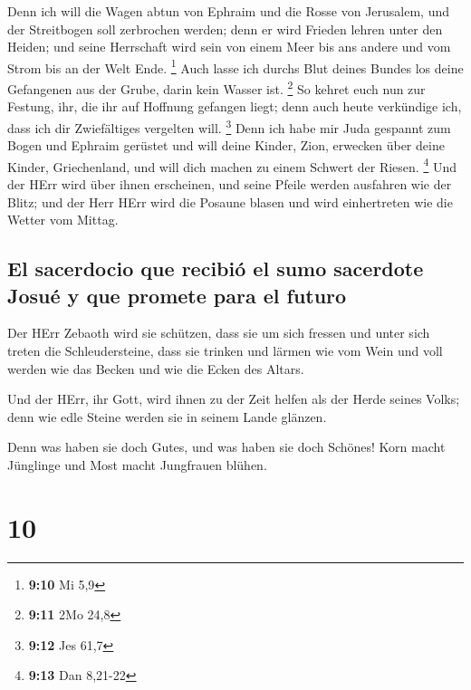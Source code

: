  Denn ich will die Wagen abtun von Ephraim und die Rosse
von Jerusalem, und der Streitbogen soll zerbrochen werden; denn er wird
Frieden lehren unter den Heiden; und seine Herrschaft wird sein von
einem Meer bis ans andere und vom Strom bis an der Welt Ende.
\footnote{\textbf{9:10} Mi 5,9}  Auch lasse ich durchs
Blut deines Bundes los deine Gefangenen aus der Grube, darin kein Wasser
ist. \footnote{\textbf{9:11} 2Mo 24,8}  So kehret euch
nun zur Festung, ihr, die ihr auf Hoffnung gefangen liegt; denn auch
heute verkündige ich, dass ich dir Zwiefältiges vergelten will.
\footnote{\textbf{9:12} Jes 61,7}  Denn ich habe mir Juda
gespannt zum Bogen und Ephraim gerüstet und will deine Kinder, Zion,
erwecken über deine Kinder, Griechenland, und will dich machen zu einem
Schwert der Riesen. \footnote{\textbf{9:13} Dan 8,21-22} 
Und der HErr wird über ihnen erscheinen, und seine Pfeile werden
ausfahren wie der Blitz; und der Herr HErr wird die Posaune blasen und
wird einhertreten wie die Wetter vom Mittag.

\hypertarget{el-sacerdocio-que-recibiuxf3-el-sumo-sacerdote-josuuxe9-y-que-promete-para-el-futuro}{%
\subsection{El sacerdocio que recibió el sumo sacerdote Josué y que
promete para el
futuro}\label{el-sacerdocio-que-recibiuxf3-el-sumo-sacerdote-josuuxe9-y-que-promete-para-el-futuro}}

 Der HErr Zebaoth wird sie schützen, dass sie um sich
fressen und unter sich treten die Schleudersteine, dass sie trinken und
lärmen wie vom Wein und voll werden wie das Becken und wie die Ecken des
Altars.

 Und der HErr, ihr Gott, wird ihnen zu der Zeit helfen
als der Herde seines Volks; denn wie edle Steine werden sie in seinem
Lande glänzen.

 Denn was haben sie doch Gutes, und was haben sie doch
Schönes! Korn macht Jünglinge und Most macht Jungfrauen blühen.

\hypertarget{section-9}{%
\section{10}\label{section-9}}

